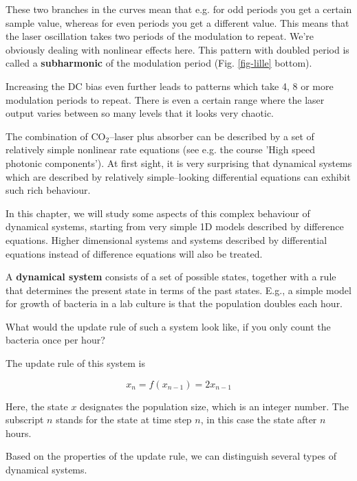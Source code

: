 These two branches in the curves mean that e.g. for odd periods you get a certain sample value, whereas for even periods you get a different value. This means that the laser oscillation takes two periods of the modulation to repeat. We're obviously dealing with nonlinear effects here. This pattern with doubled period is called a \textbf{subharmonic} of the modulation period (Fig. \ref{fig-lille} bottom).

Increasing the DC bias even further leads to patterns which take 4, 8 or more modulation periods to repeat. There is even a certain range where the laser output varies between so many levels that it looks very chaotic.

The combination of CO$_2$--laser plus absorber can be described by a set of relatively simple nonlinear rate equations (see e.g. the course 'High speed photonic components'). At first sight, it is very surprising that dynamical systems which are described by relatively simple--looking differential equations can exhibit such rich behaviour.

In this chapter, we will study some aspects of this complex behaviour of dynamical systems, starting from very simple 1D models described by difference equations. Higher dimensional systems and systems described by differential equations instead of difference equations will also be treated.



A \textbf{dynamical system} consists of a set of possible states, together with a rule that determines the present state in terms of the past states. E.g., a simple model for growth of bacteria in a lab culture is that the population doubles each hour.

\begin{cue}
  What would the update rule of such a system look like, if you only count the bacteria once per hour?
\end{cue}

The update rule of this system is

\begin{equation}
x_n = f(x_{n-1}) = 2 x_{n-1} \label{eq-exp-growth}
\end{equation}

Here, the state $x$ designates the population size, which is an integer number. The subscript $n$ stands for the state at time step $n$, in this case the state after $n$ hours.  

Based on the properties of the update rule, we can distinguish several types of dynamical systems.

